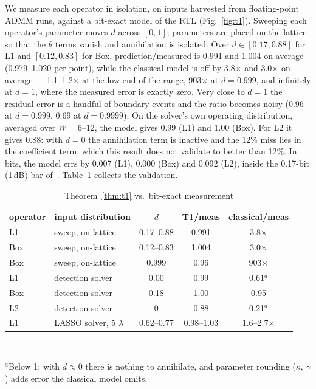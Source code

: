 \documentclass[conference]{IEEEtran}
\begin{document}
We measure each operator in isolation, on inputs harvested from floating-point
ADMM runs, against a bit-exact model of the RTL (Fig.~\ref{fig:t1}). Sweeping
each operator's parameter moves $d$ across $[0,1]$; parameters are placed on
the lattice so that the $\theta$ terms vanish and annihilation is isolated.
Over $d\in[0.17,0.88]$ for L1 and $[0.12,0.83]$ for Box, prediction/measured
is 0.991 and 1.004 on average (0.979--1.020 per point), while the
classical model is off by 3.8$\times$ and 3.0$\times$ on average --- 1.1--1.2$\times$
at the low end of the range, 903$\times$ at $d=0.999$, and infinitely at $d=1$,
where the measured error is exactly zero. Very close to $d=1$ the residual
error is a handful of boundary events and the ratio becomes noisy (0.96 at
$d=0.999$, 0.69 at $d=0.9999$). On the solver's own operating distribution,
averaged over $W=6$--12, the model gives 0.99 (L1) and 1.00 (Box). For L2 it gives 0.88:
with $d=0$ the annihilation term is inactive and the 12\% miss lies in the
coefficient term, which this result does not validate to better than 12\%.
In bits, the model errs by 0.007 (L1), 0.000 (Box) and 0.092 (L2), inside the
0.17-bit (1\,dB) bar of~\cite{li2023fam}. Table~\ref{tab:t1} collects the
validation.

\begin{table}[t]
\centering\footnotesize\setlength{\tabcolsep}{3pt}
\caption{Theorem~\ref{thm:t1} vs.\ bit-exact measurement}
\label{tab:t1}
\begin{tabular}{llccc}
\toprule
operator & input distribution & $d$ & T1/meas & classical/meas \\
\midrule
L1  & sweep, on-lattice & 0.17--0.88 & 0.991 & 3.8$\times$ \\
Box & sweep, on-lattice & 0.12--0.83 & 1.004 & 3.0$\times$ \\
Box & sweep, on-lattice & 0.999     & 0.96  & 903$\times$ \\
L1  & detection solver          & 0.00      & 0.99  & 0.61$^a$ \\
Box & detection solver          & 0.18      & 1.00  & 0.95 \\
L2  & detection solver          & 0         & 0.88  & 0.21$^a$ \\
L1  & LASSO solver, 5 $\lambda$ & 0.62--0.77 & 0.98--1.03 & 1.6--2.7$\times$ \\
\bottomrule
\end{tabular}\\[2pt]
\raggedright\scriptsize $^a$Below 1: with $d\approx0$ there is nothing to
annihilate, and parameter rounding ($\kappa$, $\gamma$) adds error the
classical model omits.
\end{table}
\end{document}
